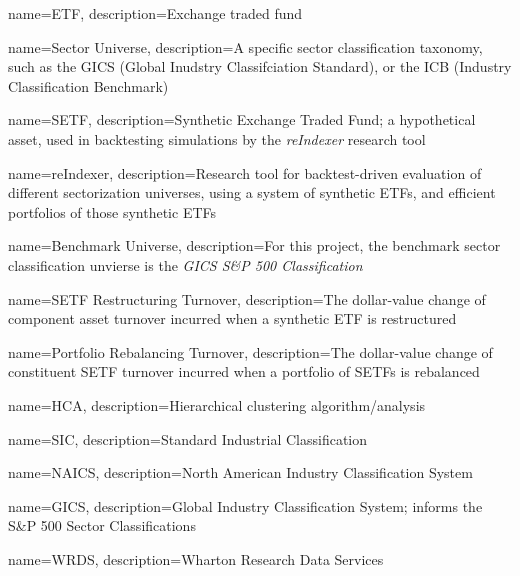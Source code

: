 \makeglossaries



{
    name=ETF,
    description={Exchange traded fund}
}


{
    name=Sector Universe,
    description={A specific sector classification taxonomy, such as the GICS (Global Inudstry Classifciation Standard), or the ICB (Industry Classification Benchmark)}
}

{
    name=SETF,
    description={Synthetic Exchange Traded Fund; a hypothetical asset, used in backtesting simulations by the \textit{reIndexer} research tool}
}

{
    name=reIndexer,
    description={Research tool for backtest-driven evaluation of different sectorization universes, using a system of synthetic ETFs, and efficient portfolios of those synthetic ETFs}
}

{
    name=Benchmark Universe,
    description={For this project, the benchmark sector classification unvierse is the \textit{GICS S\&P 500 Classification}}
}

{
    name=SETF Restructuring Turnover,
    description={The dollar-value change of component asset turnover incurred when a synthetic ETF is restructured}
}

{
    name=Portfolio Rebalancing Turnover,
    description={The dollar-value change of constituent SETF turnover incurred when a portfolio of SETFs is rebalanced}
}

{
    name=HCA,
    description={Hierarchical clustering algorithm/analysis}
}

{
    name=SIC,
    description={Standard Industrial Classification}
}

{
    name=NAICS,
    description={North American Industry Classification System}
}

{
    name=GICS,
    description={Global Industry Classification System; informs the S\&P 500 Sector Classifications}
}

{
    name=WRDS,
    description={Wharton Research Data Services}
}